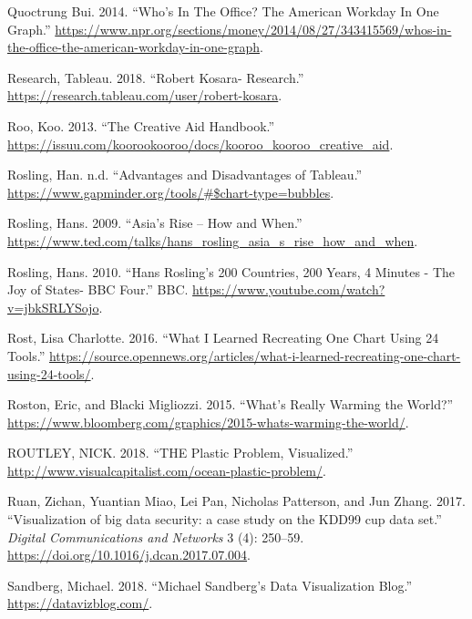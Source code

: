 \documentclass[]{book}
\begin{document}
\leavevmode\hypertarget{ref-NPR_workday}{}%
Quoctrung Bui. 2014. ``Who's In The Office? The American Workday In One Graph.'' \url{https://www.npr.org/sections/money/2014/08/27/343415569/whos-in-the-office-the-american-workday-in-one-graph}.

\leavevmode\hypertarget{ref-research_viz}{}%
Research, Tableau. 2018. ``Robert Kosara- Research.'' \url{https://research.tableau.com/user/robert-kosara}.

\leavevmode\hypertarget{ref-creative_aid_handbook}{}%
Roo, Koo. 2013. ``The Creative Aid Handbook.'' \url{https://issuu.com/koorookooroo/docs/kooroo_kooroo_creative_aid}.

\leavevmode\hypertarget{ref-han_rosling_teaching}{}%
Rosling, Han. n.d. ``Advantages and Disadvantages of Tableau.'' \url{https://www.gapminder.org/tools/\#$chart-type=bubbles}.

\leavevmode\hypertarget{ref-hans}{}%
Rosling, Hans. 2009. ``Asia's Rise -- How and When.'' \url{https://www.ted.com/talks/hans_rosling_asia_s_rise_how_and_when}.

\leavevmode\hypertarget{ref-hans_rosling}{}%
Rosling, Hans. 2010. ``Hans Rosling's 200 Countries, 200 Years, 4 Minutes - The Joy of States- BBC Four.'' BBC. \url{https://www.youtube.com/watch?v=jbkSRLYSojo}.

\leavevmode\hypertarget{ref-different_tools}{}%
Rost, Lisa Charlotte. 2016. ``What I Learned Recreating One Chart Using 24 Tools.'' \url{https://source.opennews.org/articles/what-i-learned-recreating-one-chart-using-24-tools/}.

\leavevmode\hypertarget{ref-world_warming}{}%
Roston, Eric, and Blacki Migliozzi. 2015. ``What's Really Warming the World?'' \url{https://www.bloomberg.com/graphics/2015-whats-warming-the-world/}.

\leavevmode\hypertarget{ref-plastic_pollution_infographics}{}%
ROUTLEY, NICK. 2018. ``THE Plastic Problem, Visualized.'' \url{http://www.visualcapitalist.com/ocean-plastic-problem/}.

\leavevmode\hypertarget{ref-gapminder}{}%
Ruan, Zichan, Yuantian Miao, Lei Pan, Nicholas Patterson, and Jun Zhang. 2017. ``Visualization of big data security: a case study on the KDD99 cup data set.'' \emph{Digital Communications and Networks} 3 (4): 250--59. \url{https://doi.org/10.1016/j.dcan.2017.07.004}.

\leavevmode\hypertarget{ref-sandberg_blog}{}%
Sandberg, Michael. 2018. ``Michael Sandberg's Data Visualization Blog.'' \url{https://datavizblog.com/}.
\end{document}
